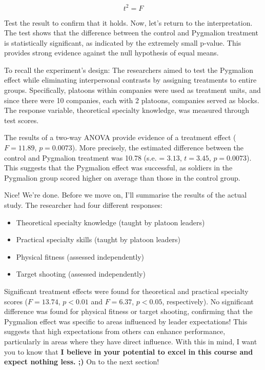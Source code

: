 \documentclass[
  letterpaper,
]{book}
\providecommand{\tightlist}{%
  \setlength{\itemsep}{0pt}\setlength{\parskip}{0pt}}\usepackage{longtable,booktabs,array}
\begin{document}
\[ t^2 = F\]

Test the result to confirm that it holds. Now, let's return to the
interpretation. The test shows that the difference between the control
and Pygmalion treatment is statistically significant, as indicated by
the extremely small p-value. This provides strong evidence against the
null hypothesis of equal means.

To recall the experiment's design: The researchers aimed to test the
Pygmalion effect while eliminating interpersonal contrasts by assigning
treatments to entire groups. Specifically, platoons within companies
were used as treatment units, and since there were 10 companies, each
with 2 platoons, companies served as blocks. The response variable,
theoretical specialty knowledge, was measured through test scores.

The results of a two-way ANOVA provide evidence of a treatment effect
(\(F = 11.89\), \(p = 0.0073\)). More precisely, the estimated
difference between the control and Pygmalion treatment was 10.78 (s.e. =
\(3.13\), \(t = 3.45\), \(p = 0.0073\)). This suggests that the
Pygmalion effect was successful, as soldiers in the Pygmalion group
scored higher on average than those in the control group.


Nice! We're done. Before we move on, I'll summarise the results of the
actual study. The researcher had four different responses:

\begin{itemize}
\tightlist
\item
  Theoretical specialty knowledge (taught by platoon leaders)
\item
  Practical specialty skills (taught by platoon leaders)
\item
  Physical fitness (assessed independently)
\item
  Target shooting (assessed independently)
\end{itemize}

Significant treatment effects were found for theoretical and practical
specialty scores (\(F = 13.74\), \(p < 0.01\) and \(F = 6.37\),
\(p < 0.05\), respectively). No significant difference was found for
physical fitness or target shooting, confirming that the Pygmalion
effect was specific to areas influenced by leader expectations! This
suggests that high expectations from others can enhance performance,
particularly in areas where they have direct influence. With this in
mind, I want you to know that \textbf{I believe in your potential to
excel in this course and expect nothing less. ;)} On to the next
section!
\end{document}
